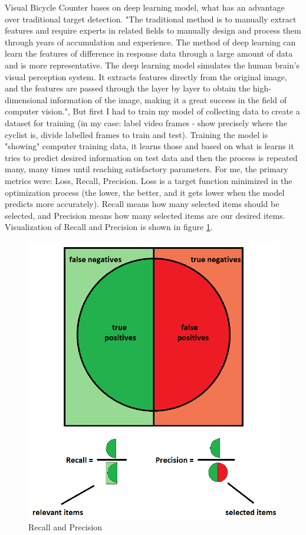Visual Bicycle Counter bases on deep learning model, what has an advantage over traditional target detection. "The traditional method is to manually extract features and require experts in related fields to manually design and process them through years of accumulation and experience. The method of deep learning can learn the features of difference in response data through a large amount of data and is more representative. The deep learning model simulates the human brain's visual perception system. It extracts features directly from the original image, and the features are passed through the layer by layer to obtain the high-dimensional information of the image, making it a great success in the field of computer vision."\cite{deepLearning}, But first I had to train my model of collecting data to create a dataset for training (in my case: label video frames - show precisely where the cyclist is, divide labelled frames to train and test). Training the model is "showing" computer training data, it learns those and based on what is learns it tries to predict desired information on test data and then the process is repeated many, many times until reaching satisfactory parameters. For me, the primary metrics were: Loss, Recall, Precision. Loss is a target function minimized in the optimization process (the lower, the better, and it gets lower when the model predicts more accurately). Recall means how many selected items should be selected, and Precision means how many selected items are our desired items. Visualization of Recall and Precision is shown in figure \ref{fig:RPL}.

\begin{figure}[H]
    \centering
    \includegraphics[scale=0.5]{images/rpl}
    \caption{Recall and Precision}
    \label{fig:RPL}
\end{figure}

